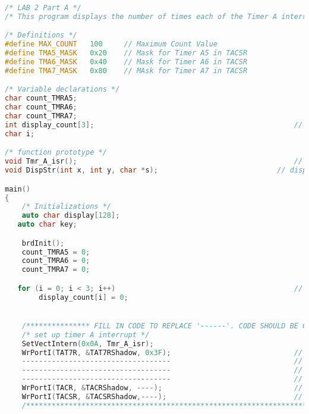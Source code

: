 \begin{lstlisting}[language=C++]
/* LAB 2 Part A */
/* This program displays the number of times each of the Timer A interrupts have occured on the computer monitor */

/* Definitions */
#define	MAX_COUNT	100     // Maximum Count Value
#define TMA5_MASK   0x20    // Mask for Timer A5 in TACSR
#define TMA6_MASK	0x40    // Mask for Timer A6 in TACSR
#define TMA7_MASK	0x80    // MAsk for Timer A7 in TACSR

/* Variable declarations */
char count_TMRA5;														// This variable will count the number of times Timer A5 has triggered an interrupted
char count_TMRA6;														// This variable will count the number of times Timer A6 has triggered an interrupted
char count_TMRA7;														// This variable will count the number of times Timer A7 has triggered an interrupted
int display_count[3];												// This variable will hold the count values divided by 100
char i;																	// iterator

/* function prototype */
void Tmr_A_isr(); 													// Timer A interrupt service routine
void DispStr(int x, int y, char *s);							// display strings on computer monitor

main()
{
	/* Initializations */
	auto char display[128];
   auto char key;

	brdInit();
	count_TMRA5 = 0;													// initialize counters to zero
	count_TMRA6 = 0;													// initialize counters to zero
	count_TMRA7 = 0;													// initialize counters to zero

   for (i = 0; i < 3; i++)											// initialize display counters to zero
		display_count[i] = 0;


	/*************** FILL IN CODE TO REPLACE '------'. CODE SHOULD BE CONSISTENT WITH COMMENTS. REFER TO FIGURE 5. IN LAB MANUAL. *******************/
	/* set up timer A interrupt */
	SetVectIntern(0x0A, Tmr_A_isr); 									// set up timer A interrupt vector
	WrPortI(TAT7R, &TAT7RShadow, 0x3F);								// set TMRA7 to count down from 63
  	-----------------------------------								// set TMRA6 to count down from 127
	-----------------------------------								// set TMRA5 to count down from 255
	-----------------------------------								// set TMRA1 to count down from 255
	WrPortI(TACR, &TACRShadow, ----);								// Clock TMRA5,TMRA6,TMRA7 by TMRA1. Clock TMRA4 by PCLK/2. Set Timer A to trigger priority 1 interrupts
	WrPortI(TACSR, &TACSRShadow,----); 								// Enable interrupts for TMRA5,TMRA6,TMRA7 only. Enable main clock for Timer A
	/************************************************************************************************************************************************/



\end{lstlisting}
